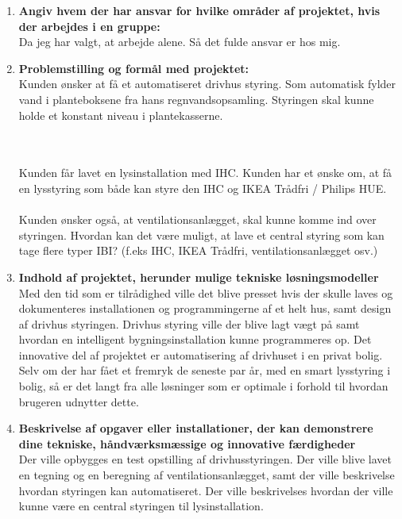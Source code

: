 \begin{enumerate}
    \item \textbf{Angiv hvem der har ansvar for hvilke områder af projektet, hvis der arbejdes i en
    gruppe:}\\ Da jeg har valgt, at arbejde alene. Så det fulde ansvar er hos mig.
    \item \textbf{Problemstilling og formål med projektet:} \\ 
    Kunden ønsker at få et automatiseret drivhus styring. Som
    automatisk fylder vand i planteboksene fra hans regnvandsopsamling.
    Styringen skal kunne holde et konstant niveau i plantekasserne. 
    
    \\ \\
    Kunden får lavet en lysinstallation med IHC. 
    Kunden har et ønske om, at få en lysstyring som både kan styre den IHC og
    IKEA Trådfri / Philips HUE. 
    \\ \\
    Kunden ønsker også, at ventilationsanlægget, skal kunne komme ind over styringen.
    Hvordan kan det være muligt, at lave et central styring som kan tage flere typer IBI? (f.eks IHC, IKEA Trådfri, ventilationsanlægget osv.)
    \item \textbf{Indhold af projektet, herunder mulige tekniske løsningsmodeller} \\ 
    Med den tid som er tilrådighed ville det blive presset hvis der skulle laves og dokumenteres installationen og programmingerne af et helt hus, samt design af drivhus styringen. 
    Drivhus styring ville der blive lagt vægt på samt hvordan en intelligent bygningsinstallation kunne programmeres op.
    Det innovative del af projektet er automatisering af drivhuset i en privat bolig. Selv om der har fået et fremryk de seneste par år, med en smart lysstyring i bolig, så er det langt fra alle løsninger som er optimale i forhold til hvordan brugeren udnytter dette. 
    \item \textbf{Beskrivelse af opgaver eller installationer, der kan demonstrere dine tekniske,
    håndværksmæssige og innovative færdigheder} \\ 
    Der ville opbygges en test opstilling af drivhusstyringen. Der ville blive lavet en tegning og en beregning af ventilationsanlægget, samt der ville beskrivelse hvordan styringen kan automatiseret. Der ville beskrivelses hvordan der ville kunne være en central styringen til lysinstallation.

\end{enumerate}
